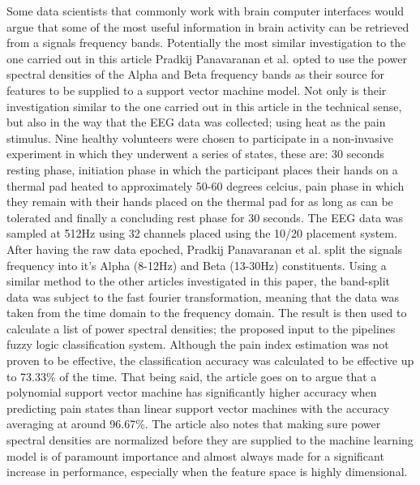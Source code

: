 \documentclass[11pt]{article}
\begin{document}
Some data scientists that commonly work with brain computer interfaces would argue that some of the most useful information in brain activity can be retrieved from a signals frequency bands. Potentially the most similar investigation to the one carried out in this article Pradkij Panavaranan et al. opted to use the power spectral densities of the Alpha and Beta frequency bands as their source for features to be supplied to a support vector machine model. Not only is their investigation similar to the one carried out in this article in the technical sense, but also in the way that the EEG data was collected; using heat as the pain stimulus. Nine healthy volunteers were chosen to participate in a non-invasive experiment in which they underwent a series of states, these are: 30 seconds resting phase, initiation phase in which the participant places their hands on a thermal pad heated to approximately 50-60 degrees celcius, pain phase in which they remain with their hands placed on the thermal pad for as long as can be tolerated and finally a concluding rest phase for 30 seconds. The EEG data was sampled at 512Hz using 32 channels placed using the 10/20 placement system. After having the raw data epoched,  Pradkij Panavaranan et al. split the signals frequency into it's Alpha (8-12Hz) and Beta (13-30Hz) constituents. Using a similar method to the other articles investigated in this paper, the band-split data was subject to the fast fourier transformation, meaning that the data was taken from the time domain to the frequency domain. The result is then used to calculate a list of power spectral densities; the proposed input to the pipelines fuzzy logic classification system. Although the pain index estimation was not proven to be effective, the classification accuracy was calculated to be effective up to 73.33\% of the time. That being said, the article goes on to argue that a polynomial support vector machine has significantly higher accuracy when predicting pain states than linear support vector machines with the accuracy averaging at around 96.67\%. The article also notes that making sure power spectral densities are normalized before they are supplied to the machine learning model is of paramount importance and almost always made for a significant increase in performance, especially when the feature space is highly dimensional. 
\end{document}
